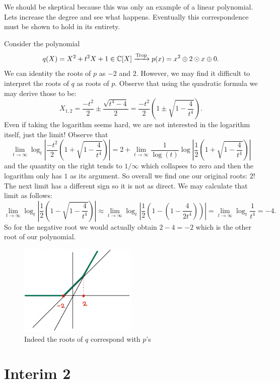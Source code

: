 \documentclass[12pt]{memoir}
\DeclareMathOperator{\Trop}{Trop}
\begin{document}
We should be skeptical because this was only an example of a linear polynomial. Lets increase the degree and see what happens. Eventually this correspondence must be shown to hold in its entirety.
\begin{Ex}
    Consider the polynomial
    $$q(X)=X^2+t^2X+1\in\bC[X]\xrightarrow[]{\Trop}p(x)=x^2\oplus 2\odot x\oplus 0.$$
    We can identity the roots of $p$ as $-2$ and $2$. However, we may find it difficult to interpret the roots of $q$ as roots of $p$. Observe that using the quadratic formula we may derive those to be:
    $$X_{1,2}=\frac{-t^2}{2}\pm\frac{\sqrt{t^4-4}}{2}=\frac{-t^2}{2}\left(1\pm\sqrt{1-\frac{4}{t^4}}\right).$$
    Even if taking the logarithm seems hard, we are not interested in the logarithm itself, just the limit! Observe that 
    $$\lim_{t\to\infty}\log_t\left|\frac{-t^2}{2}\left(1+\sqrt{1-\frac{4}{t^4}}\right)\right|=2+\lim_{t\to\infty}\frac{1}{\log(t)}\log\left|\frac{1}{2}\left(1+\sqrt{1-\frac{4}{t^4}}\right)\right|$$
    and the quantity on the right tends to $1/\infty$ which collapses to zero and then the logarithm only has $1$ as its argument. So overall we find one our original roots: $2$! The next limit has a different sign so it is not as direct. We may calculate that limit as follows:
    $$\lim_{t\to\infty}\log_t\left|\frac{1}{2}\left(1-\sqrt{1-\frac{4}{t^4}}\right)\right|\approx\lim_{t\to\infty}\log_t\left|\frac{1}{2}\left(1-\left(1-\frac{4}{2t^4}\right)\right)\right|=\lim_{t\to\infty}\log_t\frac{1}{t^4}=-4.$$
    So for the negative root we would actually obtain $2-4=-2$ which is the other root of our polynomial.
    \begin{figure}[h!]
        \centering
        \includegraphics[width=0.5\textwidth]{figs/fig4-5CorrespondenceRoots2Example.png}
        \caption{Indeed the roots of $q$ correspond with $p$'s}
        \label{fig:4.5-CorrespondenceRoots2Example}
    \end{figure}
\end{Ex}

\section{Interim 2}
\end{document}
